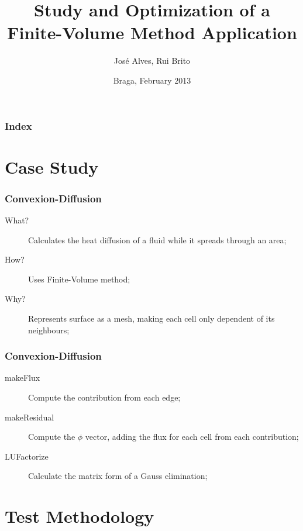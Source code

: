 \documentclass{beamer}
\title{Study and Optimization of a Finite-Volume Method Application}
\author{José Alves, Rui Brito}
\institute[pg22765, pg22781]{
	Universidade do Minho
}
\date{Braga, February 2013}
\begin{document}

\maketitle%

\begin{frame}
	\frametitle{Index}
	\tableofcontents
\end{frame}

\section{Case Study}

\begin{frame}[plain]
	\frametitle{Convexion-Diffusion}
	\begin{description}
		\item [What?] Calculates the heat diffusion of a fluid while it spreads through an area;
		\item [How?] Uses Finite-Volume method;
		\item [Why?] Represents surface as a mesh, making each cell only dependent of its neighbours;
	\end{description}
\end{frame}

\begin{frame}[plain]
	\frametitle{Convexion-Diffusion}
	\begin{description}
		\item [makeFlux] Compute the contribution from each edge;
		\item [makeResidual] Compute the $\phi$ vector, adding the flux for each cell from each contribution;
		\item [LUFactorize] Calculate the matrix form of a Gauss elimination;
	\end{description}
\end{frame}


\section{Test Methodology}
\end{document}
